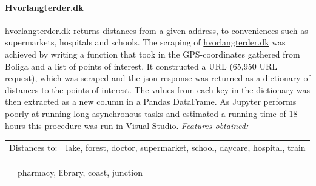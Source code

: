 \documentclass[12pt,a4paper]{article}
\begin{document}
\paragraph{\href{https://www.hvorlangterder.dk}{Hvorlangterder.dk}\newline}
\href{https://www.hvorlangterder.dk}{hvorlangterder.dk} returns distances from a given address, to conveniences such as supermarkets, hospitals and schools.   
The scraping of \href{https://www.hvorlangterder.dk}{hvorlangterder.dk} was achieved by writing a function that took in the GPS-coordinates gathered from Boliga and a list of points of interest. It constructed a URL (65,950 URL request), which was scraped and the json response was returned as a dictionary of distances to the points of interest. The values from each key in the dictionary was then extracted as a new column in a Pandas DataFrame.\newline
As Jupyter performs poorly at running long asynchronous tasks and estimated a running time of 18 hours this procedure was run in Visual Studio.
 \vspace*{10px} \newline
\textit{Features obtained:}\newline
\begin{tabular}{c c}
Distances to: & lake, forest, doctor, supermarket,	school, daycare, hospital, train \\	
\end{tabular}\newline 
\begin{tabular}{c c}
\qquad \qquad \qquad \qquad &  pharmacy, library, coast, junction \\	
\end{tabular}\newline 
\end{document}
